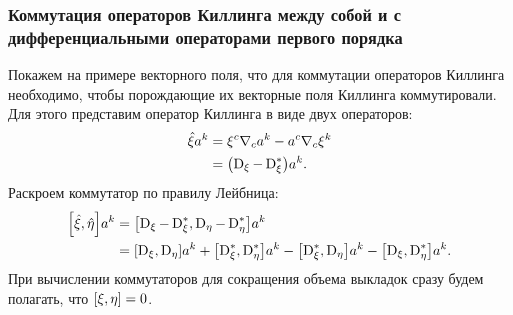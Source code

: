\documentclass[12pt,a4paper]{article}
\begin{document}

        \subsubsection{Коммутация операторов Киллинга между собой и с дифференциальными операторами первого порядка}

            Покажем на примере векторного поля, что для коммутации операторов Киллинга необходимо, чтобы порождающие их векторные поля Киллинга коммутировали. Для этого представим оператор Киллинга в виде двух операторов:
            \begin{equation}\begin{aligned}
                \hat{\mathbf{\xi}} a^k
                    &= \xi^c \nabla_c a^k - a^c \nabla_c \xi^k \\
                    &= \qty(\operatorname{D}_\xi - \operatorname{D}^{*}_\xi) a^k .
            \end{aligned}\end{equation}
            Раскроем коммутатор по правилу Лейбница:
            \begin{equation}\begin{aligned}
                \comm{\Op{\xi}}{\Op{\eta}} a^k
                    &= \comm{\D_\xi - \D^{*}_\xi}{\D_\eta - \D^{*}_\eta} a^k \\
                    &= \comm{\D_\xi}{\D_\eta} a^k
                     + \comm{\D^{*}_\xi}{\D^{*}_\eta} a^k
                     - \comm{\D^{*}_\xi}{\D_\eta} a^k
                     - \comm{\D_\xi}{\D^{*}_\eta} a^k .
            \end{aligned}\end{equation}
            При вычислении коммутаторов для сокращения объема выкладок сразу будем полагать, что $\comm{\xi}{\eta} = 0$.
\end{document}
